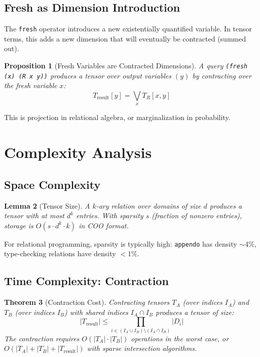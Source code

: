 \documentclass[11pt,a4paper]{article}
\newtheorem{theorem}{Theorem}
\newtheorem{lemma}[theorem]{Lemma}
\newtheorem{proposition}[theorem]{Proposition}
\begin{document}
\subsection{Fresh as Dimension Introduction}

The \texttt{fresh} operator introduces a new existentially quantified variable.
In tensor terms, this adds a new dimension that will eventually be contracted (summed out).

\begin{proposition}[Fresh Variables are Contracted Dimensions]
A query \texttt{(fresh (x) (R x y))} produces a tensor over output variables $(y)$
by contracting over the fresh variable $x$:
\[
T_{\text{result}}[y] = \bigvee_x T_R[x, y]
\]
\end{proposition}

This is projection in relational algebra, or marginalization in probability.

\section{Complexity Analysis}
\label{sec:complexity_chirho}

\subsection{Space Complexity}

\begin{lemma}[Tensor Size]
A $k$-ary relation over domains of size $d$ produces a tensor with at most $d^k$ entries.
With sparsity $s$ (fraction of nonzero entries), storage is $O(s \cdot d^k \cdot k)$ in COO format.
\end{lemma}

For relational programming, sparsity is typically high: \texttt{appendo} has density $\sim$4\%,
type-checking relations have density $< 1\%$.

\subsection{Time Complexity: Contraction}

\begin{theorem}[Contraction Cost]
\label{thm:contraction_cost_chirho}
Contracting tensors $T_A$ (over indices $I_A$) and $T_B$ (over indices $I_B$)
with shared indices $I_A \cap I_B$ produces a tensor of size:
\[
|T_{\text{result}}| \leq \prod_{i \in (I_A \cup I_B) \setminus (I_A \cap I_B)} |D_i|
\]
The contraction requires $O(|T_A| \cdot |T_B|)$ operations in the worst case,
or $O(|T_A| + |T_B| + |T_{\text{result}}|)$ with sparse intersection algorithms.
\end{theorem}
\end{document}
